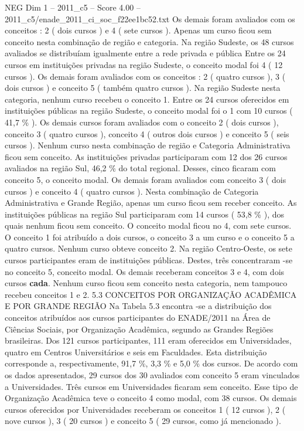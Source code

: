 \begin{textsample}{NEG Dim 1 – 2011\_c5 – Score 4.00 – 2011\_c5/enade\_2011\_ci\_soc\_f22ee1bc52.txt}
Os demais foram avaliados com os conceitos : 2 ( dois cursos ) e 4 ( sete cursos ).
Apenas um curso ficou sem conceito nesta combinação de região e categoria.
Na região Sudeste, os 48 cursos avaliados se distribuíam igualmente entre a rede privada e pública Entre os 24 cursos em instituições privadas na região Sudeste, o conceito modal foi 4 ( 12 cursos ).
Os demais foram avaliados com os conceitos : 2 ( quatro cursos ), 3 ( dois cursos ) e conceito 5 ( também quatro cursos ).
Na região Sudeste nesta categoria, nenhum curso recebeu o conceito 1.
Entre os 24 cursos oferecidos em instituições públicas na região Sudeste, o conceito modal foi o 1 com 10 cursos ( 41,7 \% ).
Os demais cursos foram avaliados com o conceito 2 ( dois cursos ), conceito 3 ( quatro cursos ), conceito 4 ( outros dois cursos ) e conceito 5 ( seis cursos ).
Nenhum curso nesta combinação de região e Categoria Administrativa ficou sem conceito.
As instituições privadas participaram com 12 dos 26 cursos avaliados na região Sul, 46,2 \% do total regional.
Desses, cinco ficaram com conceito 5, o conceito modal.
Os demais foram avaliados com conceito 3 ( dois cursos ) e conceito 4 ( quatro cursos ).
Nesta combinação de Categoria Administrativa e Grande Região, apenas um curso ficou sem receber conceito.
As instituições públicas na região Sul participaram com 14 cursos ( 53,8 \% ), dos quais nenhum ficou sem conceito.
O conceito modal ficou no 4, com sete cursos.
O conceito 1 foi atribuído a dois cursos, o conceito 3 a um curso e o conceito 5 a quatro cursos.
Nenhum curso obteve conceito 2.
Na região Centro-Oeste, os sete cursos participantes eram de instituições públicas.
Destes, três concentraram -se no conceito 5, conceito modal.
Os demais receberam conceitos 3 e 4, com dois cursos \textbf{cada}.
Nenhum curso ficou sem conceito nesta categoria, nem tampouco recebeu conceitos 1 e 2. 5.3 CONCEITOS POR ORGANIZAÇÃO ACADÊMICA E POR GRANDE REGIÃO Na Tabela 5.3 encontra -se a distribuição dos conceitos atribuídos aos cursos participantes do ENADE/2011 na Área de Ciências Sociais, por Organização Acadêmica, segundo as Grandes Regiões brasileiras.
Dos 121 cursos participantes, 111 eram oferecidos em Universidades, quatro em Centros Universitários e seis em Faculdades.
Esta distribuição corresponde a, respectivamente, 91,7 \%, 3,3 \% e 5,0 \% dos cursos.
De acordo com os dados apresentados, 29 cursos dos 30 avaliados com conceito 5 eram vinculados a Universidades.
Três cursos em Universidades ficaram sem conceito.
Esse tipo de Organização Acadêmica teve o conceito 4 como modal, com 38 cursos.
Os demais cursos oferecidos por Universidades receberam os conceitos 1 ( 12 cursos ), 2 ( nove cursos ), 3 ( 20 cursos ) e conceito 5 ( 29 cursos, como já mencionado ).

\end{textsample}
